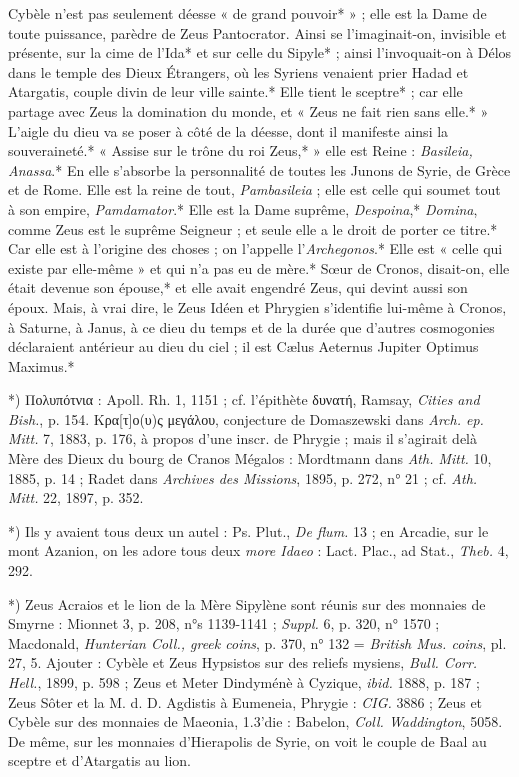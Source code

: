 \documentclass[a4paper, 11pt, oneside, polutonikogreek, french]{article}
\begin{document}
Cybèle n'est pas seulement déesse « de grand pouvoir* » ; elle est la Dame de toute puissance, parèdre de Zeus Pantocrator. Ainsi se l'imaginait-on, invisible et présente, sur la cime de l'Ida* et sur celle du Sipyle* ; ainsi l'invoquait-on à Délos dans le temple des Dieux Étrangers, où les Syriens venaient prier Hadad et Atargatis, couple divin de leur ville sainte.* Elle tient le sceptre* ; car elle partage avec Zeus la domination du monde, et « Zeus ne fait rien sans elle.* » L'aigle du dieu va se poser à côté de la déesse, dont il manifeste ainsi la souveraineté.* « Assise sur le trône du roi Zeus,* » elle est Reine : \emph{Basileia, Anassa}.* En elle s'absorbe la personnalité de toutes les Junons de Syrie, de Grèce et de Rome. Elle est la reine de tout, \emph{Pambasileia} ; elle est celle qui soumet tout à son empire, \emph{Pamdamator}.* Elle est la Dame suprême, \emph{Despoina},* \emph{Domina}, comme Zeus est le suprême Seigneur ; et seule elle a le droit de porter ce titre.* Car elle est à l'origine des choses ; on l'appelle l'\emph{Archegonos}.* Elle est « celle qui existe par elle-même » et qui n'a pas eu de mère.* Sœur de Cronos, disait-on, elle était devenue son épouse,* et elle avait engendré Zeus, qui devint aussi son époux. Mais, à vrai dire, le Zeus Idéen et Phrygien s'identifie lui-même à Cronos, à Saturne, à Janus, à ce dieu du temps et de la durée que d'autres cosmogonies déclaraient antérieur au dieu du ciel ; il est Cælus Aeternus Jupiter Optimus Maximus.*

*) Πολυπότνια : Apoll. Rh. 1, 1151 ; cf. l'épithète δυνατή, Ramsay, \emph{Cities and Bish.}, p. 154. Kρα[τ]ο(υ)ς μεγάλου, conjecture de Domaszewski dans \emph{Arch. ep. Mitt.} 7, 1883, p. 176, à propos d'une inscr. de Phrygie ; mais il s'agirait delà Mère des Dieux du bourg de Cranos Mégalos : Mordtmann dans \emph{Ath. Mitt.} 10, 1885, p. 14 ; Radet dans \emph{Archives des Missions}, 1895, p. 272, n° 21 ; cf. \emph{Ath. Mitt.} 22, 1897, p. 352.

*) Ils y avaient tous deux un autel : Ps. Plut., \emph{De flum.} 13 ; en Arcadie, sur le mont Azanion, on les adore tous deux \emph{more Idaeo} : Lact. Plac., ad Stat., \emph{Theb.} 4, 292.

*) Zeus Acraios et le lion de la Mère Sipylène sont réunis sur des monnaies de Smyrne : Mionnet 3, p. 208, n°s 1139-1141 ; \emph{Suppl.} 6, p. 320, n° 1570 ; Macdonald, \emph{Hunterian Coll., greek coins}, p. 370, n° 132 = \emph{British Mus. coins}, pl. 27, 5. Ajouter : Cybèle et Zeus Hypsistos sur des reliefs mysiens, \emph{Bull. Corr. Hell.}, 1899, p. 598 ; Zeus et Meter Dindyménè à Cyzique, \emph{ibid.} 1888, p. 187 ; Zeus Sôter et la M. d. D. Agdistis à Eumeneia, Phrygie : \emph{CIG.} 3886 ; Zeus et Cybèle sur des monnaies de Maeonia, 1.3'die : Babelon, \emph{Coll. Waddington}, 5058. De même, sur les monnaies d'Hierapolis de Syrie, on voit le couple de Baal au sceptre et d'Atargatis au lion.
\end{document}
